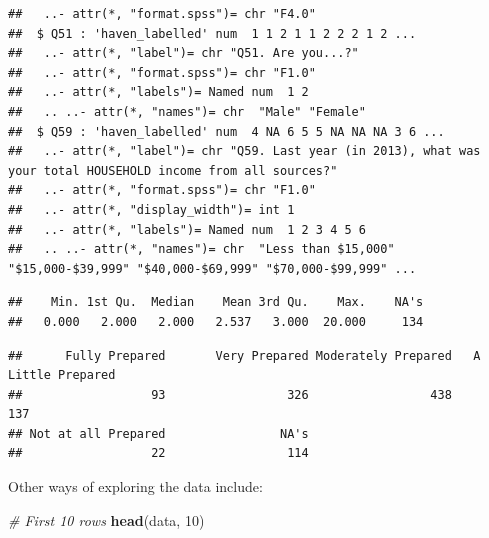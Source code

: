 \documentclass[
]{book}
\newenvironment{Shaded}{\begin{snugshade}}{\end{snugshade}}
\newcommand{\CommentTok}[1]{\textcolor[rgb]{0.56,0.35,0.01}{\textit{#1}}}
\newcommand{\DecValTok}[1]{\textcolor[rgb]{0.00,0.00,0.81}{#1}}
\newcommand{\KeywordTok}[1]{\textcolor[rgb]{0.13,0.29,0.53}{\textbf{#1}}}
\newcommand{\NormalTok}[1]{#1}
\newcommand{\OperatorTok}[1]{\textcolor[rgb]{0.81,0.36,0.00}{\textbf{#1}}}
\begin{document}
\begin{verbatim}
##   ..- attr(*, "format.spss")= chr "F4.0"
##  $ Q51 : 'haven_labelled' num  1 1 2 1 1 2 2 2 1 2 ...
##   ..- attr(*, "label")= chr "Q51. Are you...?"
##   ..- attr(*, "format.spss")= chr "F1.0"
##   ..- attr(*, "labels")= Named num  1 2
##   .. ..- attr(*, "names")= chr  "Male" "Female"
##  $ Q59 : 'haven_labelled' num  4 NA 6 5 5 NA NA NA 3 6 ...
##   ..- attr(*, "label")= chr "Q59. Last year (in 2013), what was your total HOUSEHOLD income from all sources?"
##   ..- attr(*, "format.spss")= chr "F1.0"
##   ..- attr(*, "display_width")= int 1
##   ..- attr(*, "labels")= Named num  1 2 3 4 5 6
##   .. ..- attr(*, "names")= chr  "Less than $15,000" "$15,000-$39,999" "$40,000-$69,999" "$70,000-$99,999" ...
\end{verbatim}

\begin{Shaded}
\end{Shaded}

\begin{verbatim}
##    Min. 1st Qu.  Median    Mean 3rd Qu.    Max.    NA's 
##   0.000   2.000   2.000   2.537   3.000  20.000     134
\end{verbatim}

\begin{Shaded}
\end{Shaded}

\begin{verbatim}
##      Fully Prepared       Very Prepared Moderately Prepared   A Little Prepared 
##                  93                 326                 438                 137 
## Not at all Prepared                NA's 
##                  22                 114
\end{verbatim}

Other ways of exploring the data include:

\begin{Shaded}
\begin{Highlighting}[]
\CommentTok{\# First 10 rows}
\KeywordTok{head}\NormalTok{(data, }\DecValTok{10}\NormalTok{)}
\end{Highlighting}
\end{Shaded}
\end{document}
